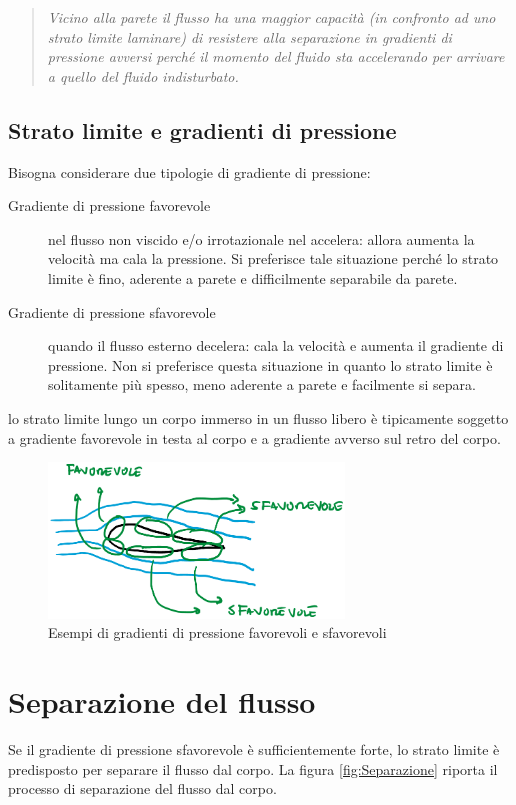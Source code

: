 \begin{quote}
\textit{Vicino alla parete il flusso ha una maggior capacità (in confronto ad uno strato limite laminare) di resistere alla separazione in gradienti di pressione avversi perché il momento del fluido sta accelerando per arrivare a quello del fluido indisturbato.}
\end{quote}

\subsection{Strato limite e gradienti di pressione}
Bisogna considerare due tipologie di gradiente di pressione:
\begin{description}
\item[Gradiente di pressione favorevole] nel flusso non viscido e/o irrotazionale nel  accelera: allora aumenta la velocità ma cala la pressione.
Si preferisce tale situazione perché lo strato limite è fino, aderente a parete e difficilmente separabile da parete.
\item[Gradiente di pressione sfavorevole] quando il flusso esterno decelera:
cala la velocità e aumenta il gradiente di pressione.
Non si preferisce questa situazione in quanto lo strato limite è solitamente più spesso, meno aderente a parete e facilmente si separa.
\end{description}
lo strato limite lungo un corpo immerso in un flusso libero è tipicamente soggetto a gradiente favorevole in testa al corpo e a gradiente avverso sul retro del corpo.

\begin{figure}
\centering
\includegraphics[width = 0.7\textwidth]{gfx/GradPressione}
\caption{Esempi di gradienti di pressione favorevoli e sfavorevoli}
\label{fig:GradPressione}
\end{figure}

\section{Separazione del flusso}
Se il gradiente di pressione sfavorevole è sufficientemente forte, lo strato limite è predisposto per separare il flusso dal corpo.
La figura \ref{fig:Separazione} riporta il processo di separazione del flusso dal corpo.

